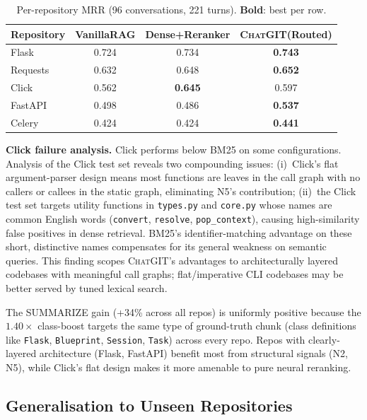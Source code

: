 \documentclass[runningheads]{llncs}
\newcommand{\chatgit}{\textsc{ChatGIT}\xspace}
\begin{document}
\begin{table}[t]
\centering
\caption{Per-repository MRR (96 conversations, 221 turns).
\textbf{Bold}: best per row.}
\label{tab:per_repo}
\small
\begin{tabular}{lccc}
\toprule
Repository & VanillaRAG & Dense+Reranker & \chatgit (Routed) \\
\midrule
Flask      & 0.724 & 0.734 & \textbf{0.743} \\
Requests   & 0.632 & 0.648 & \textbf{0.652} \\
Click      & 0.562 & \textbf{0.645} & 0.597 \\
FastAPI    & 0.498 & 0.486 & \textbf{0.537} \\
Celery     & 0.424 & 0.424 & \textbf{0.441} \\
\bottomrule
\end{tabular}
\end{table}

\textbf{Click failure analysis.} Click performs below BM25
on some configurations. Analysis of the Click test set reveals
two compounding issues: (i)~Click's flat argument-parser design
means most functions are leaves in the call graph with no callers
or callees in the static graph, eliminating N5's contribution;
(ii)~the Click test set targets
utility functions in \texttt{types.py} and \texttt{core.py} whose names are common English words
(\texttt{convert}, \texttt{resolve}, \texttt{pop\_context}),
causing high-similarity false positives in dense retrieval.
BM25's identifier-matching advantage on these short, distinctive
names compensates for its general weakness on semantic queries.
This finding scopes \chatgit's advantages to architecturally
layered codebases with meaningful call graphs; flat/imperative
CLI codebases may be better served by tuned lexical search.

The SUMMARIZE gain (+34\% across all repos) is uniformly positive
because the $1.40\times$ class-boost targets the same type of
ground-truth chunk (class definitions like \texttt{Flask},
\texttt{Blueprint}, \texttt{Session}, \texttt{Task}) across every
repo. Repos with clearly-layered architecture (Flask, FastAPI)
benefit most from structural signals (N2, N5), while Click's flat
design makes it more amenable to pure neural reranking.

\subsection{Generalisation to Unseen Repositories}
\label{sec:extended}
\end{document}
